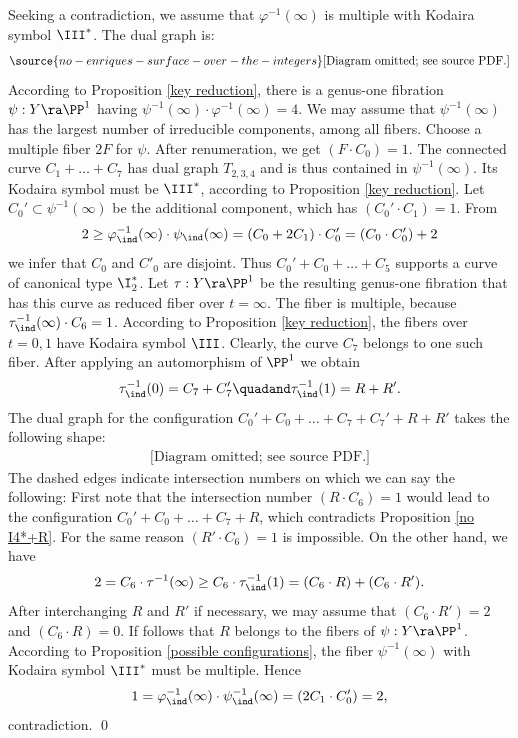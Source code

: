 \proof
Seeking a contradiction, we assume   that $\varphi^{-1}(\infty)$
is multiple with Kodaira symbol $\III^*$. The dual graph is:
\begin{equation}
\label{dual graph III*}
\source{no-enriques-surface-over-the-integers}
\begin{gathered}
\text{[Diagram omitted; see source PDF.]}
\end{gathered}
\end{equation}
According to Proposition \ref{key reduction}, there is a genus-one fibration $\psi:Y\ra\PP^1$ having $\psi^{-1}(\infty)\cdot\varphi^{-1}(\infty)=4$.
We may assume that  $\psi^{-1}(\infty)$ has the largest number of irreducible components, among all fibers.
Choose a multiple fiber  $2F$  for $\psi$. After renumeration, we get $(F\cdot C_0)=1$.
The connected curve $C_1+\ldots+C_7$ has dual graph $T_{2,3,4}$ and is thus contained in $\psi^{-1}(\infty)$. Its Kodaira
symbol must be $\III^*$, according to Proposition \ref{key reduction}. Let $C_0'\subset\psi^{-1}(\infty)$ be
the additional component, which has $(C_0'\cdot C_1)=1$. From
$$
2\geq \varphi^{-1}_\ind(\infty)\cdot \psi_\ind(\infty) = (C_0+2C_1)\cdot C'_0 = (C_0\cdot C'_0) + 2
$$
we infer that $C_0$ and $C'_0$ are disjoint.
Thus  $C_0'+C_0+\ldots+ C_5$ supports a curve of canonical type $\I_2^*$.
Let $\tau:Y\ra\PP^1$ be the resulting genus-one fibration that has this curve as reduced fiber over $t=\infty$.
The fiber is multiple, because $\tau^{-1}_\ind(\infty)\cdot C_6=1$.
According to Proposition \ref{key reduction},
the fibers over $t=0,1$ have Kodaira symbol $\III$. Clearly, the curve $C_7$ belongs to one such fiber.
After applying an automorphism of $\PP^1$ we obtain
$$
\tau^{-1}_\ind(0)= C_7+C_7'\quadand \tau^{-1}_\ind(1) = R+R'.
$$
The dual graph for the configuration $C_0'+C_0+\ldots+C_7+C_7'+R+R'$ takes the following shape:
\begin{equation*}
\begin{gathered}
\text{[Diagram omitted; see source PDF.]}
\end{gathered}
\end{equation*}
The dashed edges indicate intersection numbers on which we can say the following:
First note that the intersection number $(R\cdot C_6)=1$   would lead to the configuration $C_0'+C_0+\ldots+C_7+R$,
which contradicts   Proposition \ref{no I4*+R}.
For the same reason $(R'\cdot C_6)=1$  is impossible.
On the other hand, we have
$$
2= C_6\cdot\tau^{-1}(\infty) \geq C_6\cdot \tau^{-1}_\ind(1)=(C_6\cdot R)+(C_6\cdot R').
$$
After interchanging $R$ and $R'$ if necessary, we may assume that $(C_6\cdot R')=2$ and $(C_6\cdot R)=0$.
If follows that $R$ belongs to the fibers of  $\psi:Y\ra\PP^1$.
According to Proposition \ref{possible configurations},   the    fiber $\psi^{-1}(\infty)$
with Kodaira symbol $\III^*$ must be multiple.
Hence
$$
1=\varphi^{-1}_\ind(\infty)\cdot \psi^{-1}_\ind(\infty) = (2C_1\cdot C_0') =2,
$$
contradiction.
\qed

